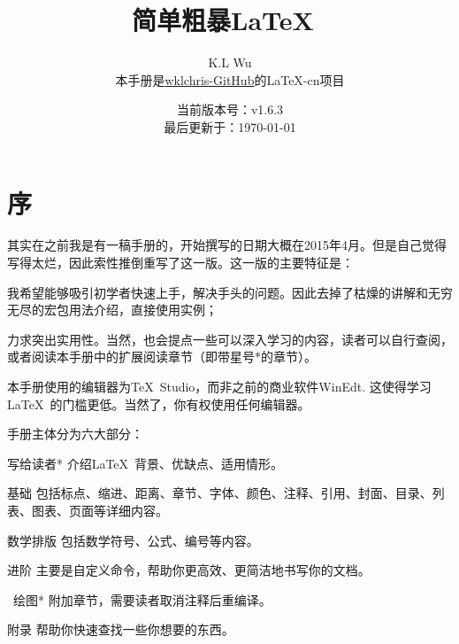 

\title{简单粗暴\LaTeX\ }
\author{K.L Wu\\
  {\kaishu 本手册是\href{https://github.com/wklchris/Note-by-LaTeX}{wklchris-GitHub}的\LaTeX{}-cn项目}
}
\date{当前版本号：v1.6.3\\
  最后更新于：\today}



\maketitle

\setlength{\lineskiplimit}{0pt}
\tableofcontents
\setlength{\lineskiplimit}{3pt}

\chapter{序}

\dpar\dpar

其实在之前我是有一稿手册的，开始撰写的日期大概在2015年4月。但是自己觉得写得太烂，因此索性推倒重写了这一版。这一版的主要特征是：
\begin{feae}
  \item 我希望能够吸引初学者快速上手，解决手头的问题。因此去掉了枯燥的讲解和无穷无尽的宏包用法介绍，直接使用实例；
  \item 力求突出实用性。当然，也会提点一些可以深入学习的内容，读者可以自行查阅，或者阅读本手册中的扩展阅读章节（即带星号*的章节）。
  \item 本手册使用的编辑器为\TeX\ Studio，而非之前的商业软件WinEdt. 这使得学习\LaTeX\ 的门槛更低。当然了，你有权使用任何编辑器。
\end{feae}

手册主体分为六大部分\cite{LHY2013latex,lamport1994latex,frank2004latex,partl2016,Casteleyn2016tikz}：
\begin{fead}
\item[写给读者*] 介绍\LaTeX\ 背景、优缺点、适用情形。
\item[基础] 包括标点、缩进、距离、章节、字体、颜色、注释、引用、封面、目录、列表、图表、页面等详细内容。
\item[数学排版] 包括数学符号、公式、编号等内容。
\item[进阶] 主要是自定义命令，帮助你更高效、更简洁地书写你的文档。
\item[\tikzz\  绘图*] 附加章节，需要读者取消注释后重编译。
\item[附录] 帮助你快速查找一些你想要的东西。
\end{fead}


